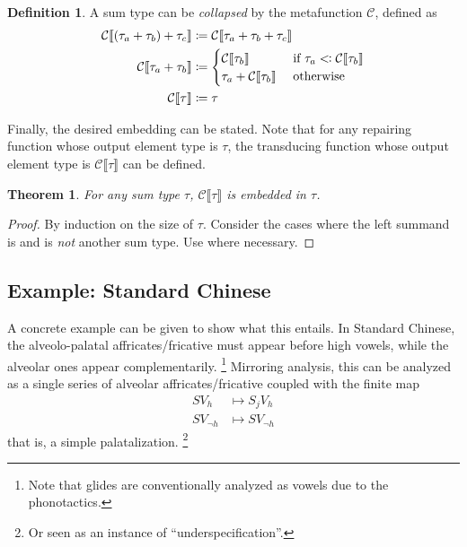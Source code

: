 \documentclass[11pt]{article}
\theoremstyle{definition}
\newtheorem{definition}{Definition}
\theoremstyle{plain}
\newtheorem{theorem}{Theorem}
\newcommand{\coloneq}{\mathrel{\vcentcolon\mkern-1.2mu=}}
\newcommand{\subt}{\mathrel{<\mkern-1.2mu\vcentcolon}}
\newcommand{\metab}[1]{\llbracket#1\rrbracket}
\begin{document}
\begin{definition}
  A sum type can be \emph{collapsed} by the metafunction
  \(\mathcal{C}\), defined as
  \begin{align*}
    \mathcal{C}\metab{(\tau_{a} + \tau_{b}) + \tau_{c}}
      &\coloneq \mathcal{C}\llbracket
        \tau_{a} + \tau_{b} + \tau_{c}\rrbracket
    \\
    \mathcal{C}\metab{\tau_{a} + \tau_{b}}
      &\coloneq
        \begin{cases}
          \mathcal{C}\metab{\tau_{b}}
            &\text{ if \(\tau_{a} \subt \mathcal{C}\metab{\tau_{b}}\)}
          \\
          \tau_{a} + \mathcal{C}\metab{\tau_{b}}
            &\text{ otherwise}
        \end{cases}
    \\
    \mathcal{C}\metab{\tau}
      &\coloneq \tau
  \end{align*}
\end{definition}

Finally, the desired embedding can be stated.  Note
that for any repairing function whose output element type is \(\tau\),
the transducing function whose output element type is
\(\mathcal{C}\metab{\tau}\) can be defined.

\begin{theorem}
  For any sum type \(\tau\), \(\mathcal{C}\metab{\tau}\) is embedded
  in \(\tau\).
\end{theorem}

\begin{proof}
  By induction on the size of \(\tau\).  Consider the cases where the
  left summand is and is \emph{not} another sum type.  Use
   where necessary.
\end{proof}

\subsection{Example: Standard Chinese}
A concrete example can be given to show what this entails.  In
Standard Chinese, the alveolo-palatal affricates/fricative must appear
before high vowels, while the alveolar ones appear complementarily.%
\footnote{Note that glides are conventionally analyzed as vowels due
  to the phonotactics.}
%
Mirroring  analysis, this can be analyzed as a single
series of alveolar affricates/fricative coupled with the finite map
%
\begin{align*}
  SV_{h} &\mapsto S_{j}V_{h} \\
  SV_{\neg h} & \mapsto SV_{\neg h}
\end{align*}
%
that is, a simple palatalization.%
\footnote{Or seen as an instance of \enquote{underspecification}.}
\end{document}
